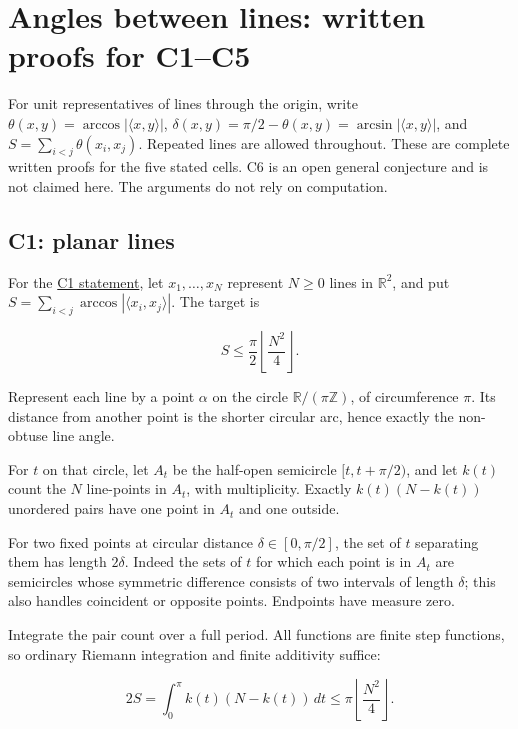 \documentclass[11pt,a4paper]{article}
\begin{document}
\section{Angles between lines: written proofs for C1--C5}\label{angles-between-lines-written-proofs-for-c1c5}

For unit representatives of lines through the origin, write \(\theta(x,y)=\arccos|\langle x,y\rangle|\), \(\delta(x,y)=\pi/2-\theta(x,y)=\arcsin|\langle x,y\rangle|\), and \(S=\sum_{i<j}\theta(x_i,x_j)\). Repeated lines are allowed throughout. These are complete written proofs for the five stated cells. C6 is an open general conjecture and is not claimed here. The arguments do not rely on computation.

\subsection{C1: planar lines}\label{c1-planar-lines}

For the \href{https://hackathon.bainsa.ai/p/p1/c1}{C1 statement}, let \(x_1,\ldots,x_N\) represent \(N\ge0\) lines in \(\mathbb R^2\), and put \(S=\sum_{i<j}\arccos|\langle x_i,x_j\rangle|\). The target is

\[
S\le\frac{\pi}{2}\left\lfloor\frac{N^2}{4}\right\rfloor.
\]

Represent each line by a point \(\alpha\) on the circle \(\mathbb R/(\pi\mathbb Z)\), of circumference \(\pi\). Its distance from another point is the shorter circular arc, hence exactly the non-obtuse line angle.

For \(t\) on that circle, let \(A_t\) be the half-open semicircle \([t,t+\pi/2)\), and let \(k(t)\) count the \(N\) line-points in \(A_t\), with multiplicity. Exactly \(k(t)(N-k(t))\) unordered pairs have one point in \(A_t\) and one outside.

For two fixed points at circular distance \(\delta\in[0,\pi/2]\), the set of \(t\) separating them has length \(2\delta\). Indeed the sets of \(t\) for which each point is in \(A_t\) are semicircles whose symmetric difference consists of two intervals of length \(\delta\); this also handles coincident or opposite points. Endpoints have measure zero.

Integrate the pair count over a full period. All functions are finite step functions, so ordinary Riemann integration and finite additivity suffice:

\[
2S=\int_0^\pi k(t)(N-k(t))\,dt
\le \pi\left\lfloor\frac{N^2}{4}\right\rfloor.
\]
\end{document}
